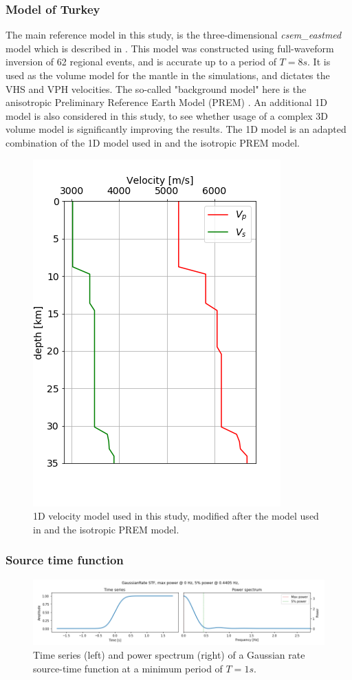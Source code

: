 \documentclass[../Text/00main.tex]{subfiles}
\begin{document}
\subsubsection{Model of Turkey}

The main reference model in this study, is the three-dimensional \textit{csem\_eastmed} model which is described in \citet{cubuk-sabuncu_3-d_2017}. This model was constructed using full-waveform inversion of 62 regional events, and is accurate up to a period of $T = 8 s$. It is used as the volume model for the mantle in the simulations, and dictates the VHS and VPH velocities. The so-called "background model" here is the anisotropic Preliminary Reference Earth Model (PREM) \citep{dziewonski1981preliminary}. An additional 1D model is also considered in this study, to see whether usage of a complex 3D volume model is significantly improving the results. The 1D model is an adapted combination of the 1D model used in \citet{pulido_sensitivity_2007} and the isotropic PREM model. 

\begin{figure}
    \centering
    \includegraphics[width=.3\textwidth]{images_methods/1D_velocity_model_fig.png}
    \caption{1D velocity model used in this study, modified after the model used in \citet{pulido_sensitivity_2007} and the isotropic PREM model.}
    \label{fig:1dmodel}
\end{figure}


\subsubsection{Source time function}

\begin{figure}[h!]
    \centering
    \includegraphics{images_methods/GR_stf_image.png}
    \caption{Time series (left) and power spectrum (right) of a Gaussian rate source-time function at a minimum period of $ T=1 s$.}
    \label{fig:Gaussian_rate_stf}
\end{figure}
\end{document}
